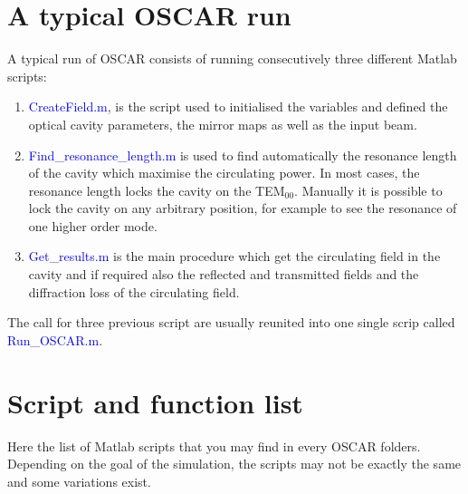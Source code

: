 \section{A typical OSCAR run}

A typical run of OSCAR consists of running consecutively three different Matlab scripts:

\begin{enumerate}
  \item \textcolor{blue}{CreateField.m}, is the script used to initialised the variables and defined the optical cavity parameters, the mirror maps as well as the input beam.
  \item \textcolor{blue}{Find\_resonance\_length.m} is used to find automatically the resonance length of the cavity which maximise the circulating power. In most cases, the resonance length locks the cavity on the TEM$_{00}$. Manually it is possible to lock the cavity on any arbitrary position, for example to see the resonance of one higher order mode.
  \item \textcolor{blue}{Get\_results.m} is the main procedure which get the circulating field in the cavity and if required also the reflected and transmitted fields and the diffraction loss of the circulating field.
\end{enumerate}

The call for three previous script are usually reunited into one single scrip called \textcolor{blue}{Run\_OSCAR.m}.

\section{Script and function list}

Here the list of Matlab scripts that you may find in every OSCAR folders. Depending on the goal of the simulation, the scripts may not be exactly the same and some variations exist.

